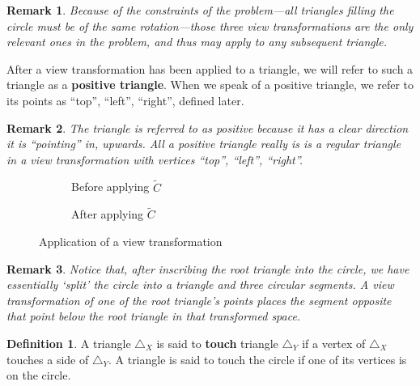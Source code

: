 \documentclass[a4paper,12pt]{article}
\newcommand{\HSview}[1][V]{\widetilde{#1}}
\newtheorem*{remark}{Remark}
\theoremstyle{definition}
\newtheorem{definition}[theorem]{Definition}
\theoremstyle{plain}
\begin{document}
	\begin{remark}
		Because of the constraints of the problem---all triangles filling the circle must be of the same rotation---those three
		view transformations are the only relevant ones in the problem, and thus may apply to any subsequent triangle.
	\end{remark}

	After a view transformation has been applied to a triangle, we will
	refer to such a triangle as a \textbf{positive triangle}.
	When we speak of a positive triangle, we refer to its points as ``top'', ``left'', ``right'', defined later.

	\begin{remark}
		The triangle is referred to as positive because it has a clear direction it is ``pointing'' in, upwards.
		All a positive triangle really is is a regular triangle in a view transformation with vertices ``top'', ``left'', ``right''.
	\end{remark}

	\begin{figure}[h]
		\begin{subfigure}{0.5\textwidth}
			\centering
			\def\svgwidth{\columnwidth}
			\scalebox{0.85}{}
			\caption{Before applying $\HSview[C]$}
		\end{subfigure}
		\begin{subfigure}{0.5\textwidth}
			\centering
			\def\svgwidth{\columnwidth}
			\scalebox{0.85}{}
			\caption{After applying $\HSview[C]$}
		\end{subfigure}
		\caption{Application of a view transformation}
	\end{figure}
	
	\begin{remark}
		Notice that, after inscribing the root triangle into the circle, we have essentially `split' the circle into a triangle and three circular segments.
		A view transformation of one of the root triangle's points places the segment opposite that point below the root triangle in that transformed space.
	\end{remark}
	
	\begin{definition}
		A triangle $\triangle_X$ is said to \textbf{touch} triangle $\triangle_Y$ if a vertex of $\triangle_X$ touches a side of $\triangle_Y$.
		A triangle is said to touch the circle if one of its vertices is on the circle.
	\end{definition}
	
\end{document}
